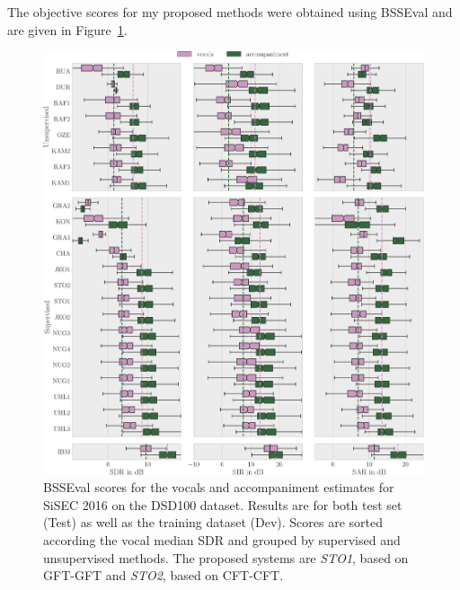 The objective scores for my proposed methods were obtained using BSSEval and are given in Figure~\ref{fig:eval}.

\begin{figure}[htbp]
    \includegraphics[width=1.1\textwidth]{Chapters/06_Separation_Unknown/figures/evaluation.pdf}
    \caption{BSSEval scores for the vocals and accompaniment estimates for SiSEC 2016 on the DSD100 dataset. Results are for both test set (Test) as well as the training dataset (Dev). Scores are sorted according the vocal median SDR and grouped by supervised and unsupervised methods. The proposed systems are \emph{STO1}, based on GFT-GFT and \emph{STO2}, based on CFT-CFT.}
    \label{fig:eval}
\end{figure}

